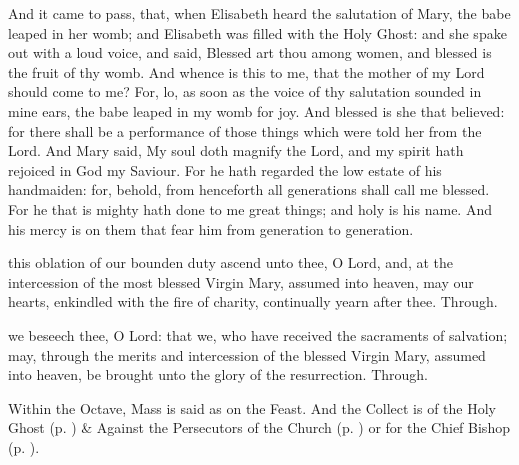 

 And it came to pass, that, when Elisabeth heard the salutation of Mary, the babe leaped in her womb; and Elisabeth was filled with the Holy Ghost: and she spake out with a loud voice, and said, Blessed art thou among women, and blessed is the fruit of thy womb. And whence is this to me, that the mother of my Lord should come to me? For, lo, as soon as the voice of thy salutation sounded in mine ears, the babe leaped in my womb for joy. And blessed is she that believed: for there shall be a performance of those things which were told her from the Lord. And Mary said, My soul doth magnify the Lord, and my spirit hath rejoiced in God my Saviour. For he hath regarded the low estate of his handmaiden: for, behold, from henceforth all generations shall call me blessed. For he that is mighty hath done to me great things; and holy is his name. And his mercy is on them that fear him from generation to generation.


\secret
{} this oblation of our bounden duty ascend unto thee, O Lord, and, at the intercession of the most blessed Virgin Mary, assumed into heaven, may our hearts, enkindled with the fire of charity, continually yearn after thee. Through.

\postcommunion
{} we beseech thee, O Lord: that we, who have received the sacraments of salvation; may, through the merits and intercession of the blessed Virgin Mary, assumed into heaven, be brought unto the glory of the resurrection. Through.

\begin{rubric}
    Within the Octave, Mass is said as on the Feast. And the  Collect is of the Holy Ghost (p. \pageref{SPHolyGhost}) \&  Against the Persecutors of the Church (p. \pageref{SPAgainst}) or for the Chief Bishop (p. \pageref{SPChiefBishop}).
\end{rubric}

